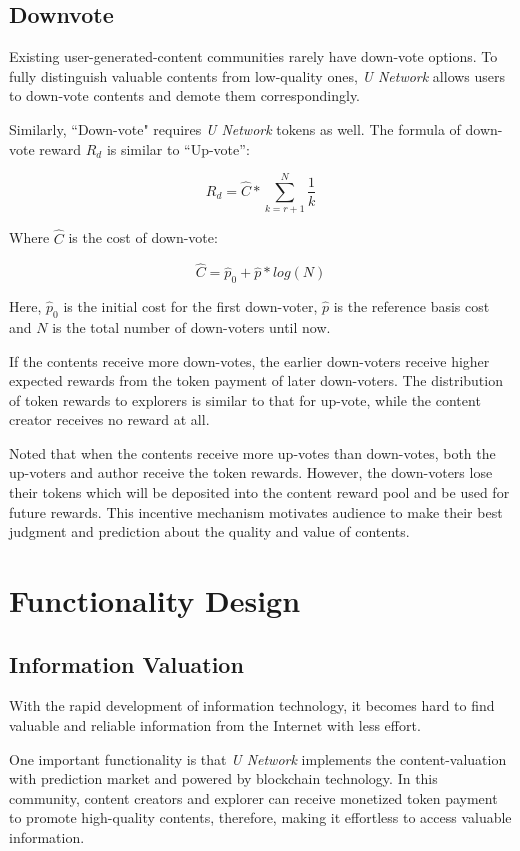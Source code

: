 \subsection{Downvote}
Existing user-generated-content communities rarely have down-vote options. To fully distinguish valuable contents from low-quality ones, \emph{U Network} allows users to down-vote contents and demote them correspondingly.

Similarly, ``Down-vote" requires \emph{U Network} tokens as well. The formula of down-vote reward $R_d$ is similar to ``Up-vote'':
\begin{center}
$$R_d = \hat C * \sum_{k=r+1}^{N} \frac{1}{k}$$
\end{center}
Where $\hat C$ is the cost of down-vote:
 \begin{center}
$$\hat C = \hat p_0 + \hat p * log(N)$$
\end{center}
Here, $\hat p_0$ is the initial cost for the first down-voter, $\hat p$ is the reference basis cost and $N$ is the total number of down-voters until now. 
 
If the contents receive more down-votes, the earlier down-voters receive higher expected rewards from the token payment of later down-voters. The distribution of token rewards to explorers is similar to that for up-vote, while the content creator receives no reward at all. 

Noted that when the contents receive more up-votes than down-votes, both the up-voters and author receive the token rewards. However, the down-voters lose their tokens which will be deposited into the content reward pool and be used for future rewards. This incentive mechanism motivates audience to make their best judgment and prediction about the quality and value of contents.




\section{Functionality Design}
\subsection{ Information Valuation}
With the rapid development of information technology, it becomes hard to find valuable and reliable information from the Internet with less effort.  

One important functionality is that \emph{U Network} implements the content-valuation with prediction market and powered by blockchain technology. 
In this community, content creators and explorer can receive monetized token payment to promote high-quality contents, therefore, making it effortless to access valuable information.

